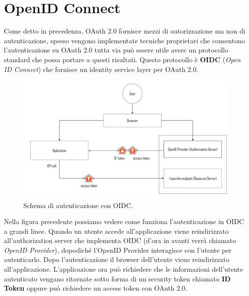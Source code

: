 \chapter{OpenID Connect}

Come detto in precedenza, OAuth 2.0 fornisce mezzi di autorizzazione ma non di
autenticazione, spesso vengono implementate tecniche proprietari che consentono
l'autenticazione su OAuth 2.0 tutta via può essere utile avere un protocollo standard
che possa portare a questi risultati.
Questo protocollo è \textbf{OIDC} (\textit{Open ID Connect}) che fornisce un identity service layer
per OAuth 2.0.

\begin{figure}[H]
    \centering
    \includegraphics[width=\textwidth, keepaspectratio]{capitoli/id_managing/imgs/oidc1.png}
    \caption{Schema di autenticazione con OIDC.}
\end{figure}

Nella figura precedente possiamo vedere come funziona l'autenticazione in OIDC a
grandi linee.
Quando un utente accede all'applicazione viene reindirizzato all'authorization server
che implementa OIDC (d'ora in avanti verrà chiamato \textit{OpenID Provider}),
dopodiché l'OpenID Provider interagisce con l'utente per autenticarlo.
Dopo l'autenticazione il browser dell'utente viene reindirizzato all'applicazione.
L'applicazione ora può richiedere che le informazioni dell'utente autenticato vengano
ritornate sotto forma di un security token chiamato \textbf{ID Token} oppure può
richiedere un access token con OAuth 2.0.